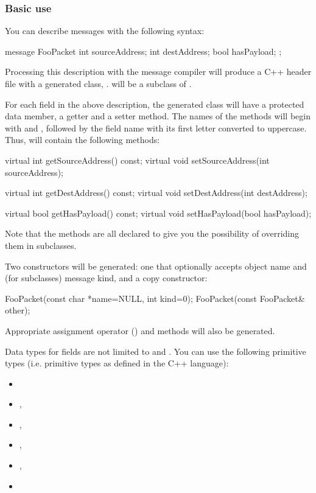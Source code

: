\subsubsection{Basic use}

You can describe messages with the following syntax:

\begin{msg}
message FooPacket
{
    int sourceAddress;
    int destAddress;
    bool hasPayload;
};
\end{msg}

Processing this description with the message compiler will produce
a C++ header file with a generated class, .
 will be a subclass of .

For each field in the above description, the generated class will have
a protected data member, a getter and a setter method. The names of the
methods will begin with  and ,
followed by the field name with its first letter converted to uppercase.
Thus,  will contain the following methods:

\begin{cpp}
virtual int getSourceAddress() const;
virtual void setSourceAddress(int sourceAddress);

virtual int getDestAddress() const;
virtual void setDestAddress(int destAddress);

virtual bool getHasPayload() const;
virtual void setHasPayload(bool hasPayload);
\end{cpp}

Note that the methods are all declared  to give you the possibility
of overriding them in subclasses.

Two constructors will be generated: one that optionally accepts object name and
(for  subclasses) message kind, and a copy constructor:

\begin{cpp}
FooPacket(const char *name=NULL, int kind=0);
FooPacket(const FooPacket& other);
\end{cpp}

Appropriate assignment operator () and  methods will
also be generated.

Data types for fields are not limited to  and
. You can use the following primitive types (i.e. primitive
types as defined in the C++ language):

\begin{itemize}
   \item {}
   \item {}, 
   \item {}, 
   \item {}, 
   \item {}, 
   \item {}
\end{itemize}

